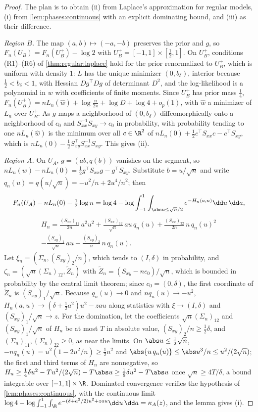 \begin{refsection}
\begin{proof}
The plan is to obtain (ii) from Laplace's approximation for regular models, (i) from \cref{lem:phases:continuous} with an explicit dominating bound, and (iii) as their difference.

\emph{Region $B$.} The map $(a,b)\mapsto(-a,-b)$ preserves the prior and $g$, so $F_n(U_B)=F_n(U_B^+)-\log2$ with $U_B^+=[-1,1]\times[\frac12,1]$. On $U_B^+$, conditions (R1)--(R6) of \cref{thm:regular:laplace} hold for the prior renormalized to $U_B^+$, which is uniform with density $1$: $L$ has the unique minimizer $(0,b_\delta)$, interior because $\frac12<b_\delta<1$, with Hessian $Dg^\top Dg$ of determinant $D^2$, and the log-likelihood is a polynomial in $w$ with coefficients of finite moments. Since $U_B^+$ has prior mass $\frac14$, $F_n(U_B^+)=nL_n(\hat w)+\log\frac n{2\pi}+\log D+\log4+o_p(1)$, with $\hat w$ a minimizer of $L_n$ over $U_B^+$. As $g$ maps a neighborhood of $(0,b_\delta)$ diffeomorphically onto a neighborhood of $c_0$ and $S_{xx}^{-1}S_{xy}\to c_0$ in probability, with probability tending to one $nL_n(\hat w)$ is the minimum over all $c\in\R^2$ of $nL_n(0)+\frac12c^\top S_{xx}c-c^\top S_{xy}$, which is $nL_n(0)-\frac12S_{xy}^\top S_{xx}^{-1}S_{xy}$. This gives (ii).

\emph{Region $A$.} On $U_A$, $g=(ab,q(b))$ vanishes on the segment, so $nL_n(w)-nL_n(0)=\frac12g^\top S_{xx}g-g^\top S_{xy}$. Substitute $b=u/\sqrt n$ and write $q_n(u)=q(u/\sqrt n)=-u^2/n+2u^4/n^2$; then
\[
F_n(U_A)-nL_n(0)-\tfrac12\log n=\log4-\log\int_{-1}^1\int_{\abs u\le\sqrt n/2}e^{-H_n(a,u)}\dd u\,\dd a,
\]
\begin{multline*}
H_n=\frac{(S_{xx})_{11}}{2n}\,a^2u^2+\frac{(S_{xx})_{12}}{\sqrt n}\,au\,q_n(u)+\frac{(S_{xx})_{22}}{2n}\,n\,q_n(u)^2\\
-\frac{(S_{xy})_1}{\sqrt n}\,au-\frac{(S_{xy})_2}n\,n\,q_n(u).
\end{multline*}
Let $\xi_n=(\Sigma_n,(S_{xy})_2/n)$, which tends to $(I,\delta)$ in probability, and $\zeta_n=(\sqrt n(\Sigma_n)_{12},\tilde Z_n)$ with $\tilde Z_n=(S_{xy}-nc_0)/\sqrt n$, which is bounded in probability by the central limit theorem; since $c_0=(0,\delta)$, the first coordinate of $\tilde Z_n$ is $(S_{xy})_1/\sqrt n$. Because $q_n(u)\to0$ and $nq_n(u)\to-u^2$, $H_n(a,u)\to(\delta+\frac12a^2)u^2-zau$ along statistics with $\xi\to(I,\delta)$ and $(S_{xy})_1/\sqrt n\to z$. For the domination, let the coefficients $\sqrt n(\Sigma_n)_{12}$ and $(S_{xy})_1/\sqrt n$ of $H_n$ be at most $T$ in absolute value, $(S_{xy})_2/n\ge\frac12\delta$, and $(\Sigma_n)_{11},(\Sigma_n)_{22}\ge0$, as near the limits. On $\abs u\le\frac12\sqrt n$, $-nq_n(u)=u^2(1-2u^2/n)\ge\frac12u^2$ and $\abs{u\,q_n(u)}\le\abs u^3/n\le u^2/(2\sqrt n)$; the first and third terms of $H_n$ are nonnegative, so $H_n\ge\frac14\delta u^2-Tu^2/(2\sqrt n)-T\abs u\ge\frac18\delta u^2-T\abs u$ once $\sqrt n\ge4T/\delta$, a bound integrable over $[-1,1]\times\R$. Dominated convergence verifies the hypothesis of \cref{lem:phases:continuous}, with the continuous limit $\log4-\log\int_{-1}^1\int_\R e^{-(\delta+a^2/2)u^2+zau}\dd u\,\dd a=\kappa_A(z)$, and the lemma gives (i).


\end{proof}
\end{refsection}
